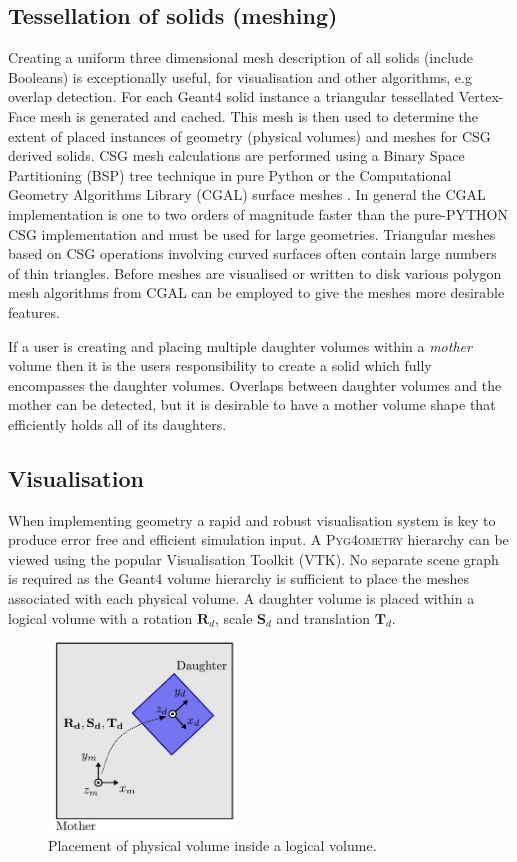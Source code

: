 \documentclass[final,5p,times,twocolumn]{elsarticle}
\newcommand{\PYGEOMETRY}{\textsc{Pyg4ometry}}
\begin{document}
\subsection{Tessellation of solids (meshing)}
Creating a uniform three dimensional mesh description of all solids (include Booleans) is exceptionally useful, for visualisation and other algorithms, e.g overlap 
detection. For each Geant4 solid instance a triangular tessellated Vertex-Face mesh is generated and cached. This mesh is then used to determine the extent 
of placed instances of geometry (physical volumes) and meshes for CSG derived solids. CSG mesh calculations are performed using a Binary Space Partitioning (BSP) tree technique in  pure Python \cite{pycsg} or the Computational Geometry Algorithms Library (CGAL) surface meshes \cite{cgal:bsmf-sm-20b}. In general the CGAL implementation is one to two orders of magnitude faster than the pure-PYTHON CSG implementation and must be used for large geometries. Triangular meshes based on CSG operations involving curved surfaces often contain large numbers of thin triangles. Before meshes are visualised or written to disk various polygon mesh algorithms  from CGAL \cite{cgal:lty-pmp-20b} can be employed to give the meshes more desirable features. 

If a user is creating and placing multiple daughter volumes within a {\em mother} volume then it is the users responsibility to create a solid which fully 
encompasses the daughter volumes. Overlaps between daughter volumes and the mother can be detected, but it is desirable to have a mother volume 
shape that efficiently holds all of its daughters. 
 
\subsection{Visualisation} \label{sec:visualisation}
When implementing geometry a rapid and robust visualisation system is key to produce error free and efficient simulation input.
A  \PYGEOMETRY{}  hierarchy can be viewed using the popular Visualisation Toolkit (VTK). No separate scene graph is required as the Geant4 volume hierarchy is sufficient 
to place the meshes associated with each physical volume. A daughter volume is placed within a logical volume with a rotation $\mathbf{R}_d$, scale $\mathbf{S}_d$ and translation $\mathbf{T}_d$.

\begin{figure}[htb!]
\begin{center}
\includegraphics[width=5cm]{./diagrams/lvToPv.pdf}
\caption{Placement of physical volume inside a logical volume.}
\label{fig:lvToPv}
\end{center}
\end{figure} 
\end{document}
